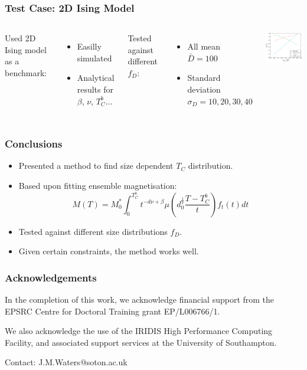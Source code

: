 \documentclass{beamer}
\begin{document}
\begin{frame}
	\frametitle{Test Case: 2D Ising Model}
	\begin{columns}
	\column{7cm}
		Used 2D Ising model as a benchmark:
		\begin{itemize}
			\item{Easilly simulated}
			\item{Analytical results for $\beta$, $\nu$, $T_C^b$...}
		\end{itemize} \vspace{4mm}
		
		Tested against different $f_D$:
		\begin{itemize}
			\item{All mean $\bar{D}=100$}
			\item{Standard deviation $\sigma_D=10, 20, 30 ,40$}
		\end{itemize}
	\column{5cm}
		\includegraphics[width=5cm]{Images/percs}
	\end{columns}
\end{frame}

\begin{frame}
	\frametitle{Conclusions}
	\begin{itemize}
		\item{Presented a method to find size dependent $T_C$ distribution.}
		\item{Based upon fitting ensemble magnetisation:}
		$$
		M(T) = M_0^*\int_0^{T_C^b} t^{-d\nu +\beta} \mu\left(d_0^{\frac{1}{\nu}}\frac{T-T_C^b}{t}\right) f_t(t) dt
		$$
		\item{Tested against different size distributions $f_D$.}
		\item{Given certain constraints, the method works well.}
	\end{itemize}
\end{frame}

\begin{frame}
	\frametitle{Acknowledgements}
	In the completion of this work, we acknowledge financial support from the EPSRC Centre for Doctoral Training grant EP/L006766/1. \newline
	
	We also acknowledge the use of the IRIDIS High Performance Computing Facility, and associated support services at the University of
Southampton. \newline

	Contact: J.M.Waters@soton.ac.uk
\end{frame}
\end{document}
